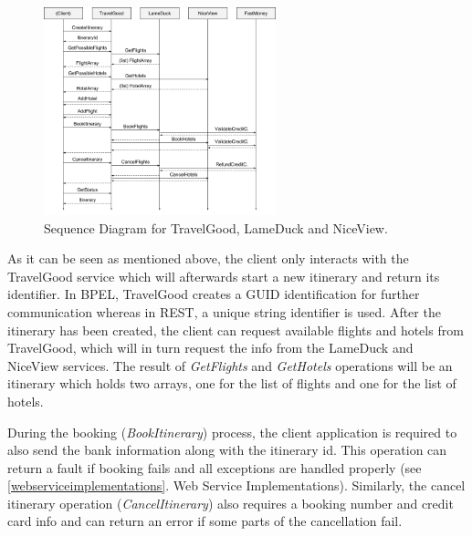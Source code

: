 \begin{figure}[H]
\centering
\includegraphics[width=0.6\textwidth]{images/SequenceDiagram}
\caption{Sequence Diagram for TravelGood, LameDuck and NiceView.}
\label{sequencediagram}
\end{figure}

As it can be seen as mentioned above, the client only interacts with the TravelGood service which will afterwards start a new itinerary and return its identifier. In BPEL, TravelGood creates a GUID identification for further communication whereas in REST, a unique string identifier is used. After the itinerary has been created, the client can request available flights and hotels from TravelGood, which will in turn request the info from the LameDuck and NiceView services. The result of \textit{GetFlights} and \textit{GetHotels} operations will be an itinerary which holds two arrays, one for the list of flights and one for the list of hotels. 

During the booking (\textit{BookItinerary}) process, the client application is required to also send the bank information along with the itinerary id. This operation can return a fault if booking fails and all exceptions are handled properly (see \ref{webserviceimplementations}. Web Service Implementations). 
Similarly, the cancel itinerary operation (\textit{CancelItinerary}) also requires a booking number and credit card info and can return an error if some parts of the cancellation fail.
